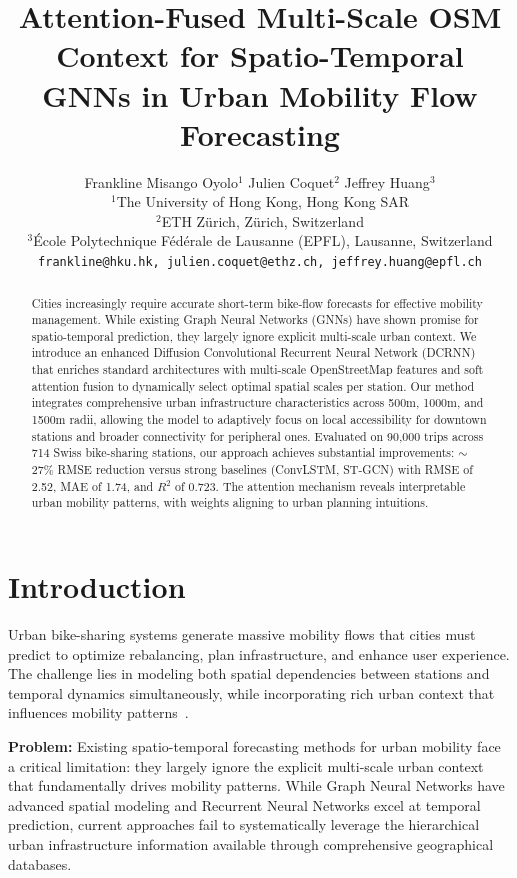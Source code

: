 \documentclass[10pt,twocolumn]{article}
\title{Attention-Fused Multi-Scale OSM Context for Spatio-Temporal GNNs in Urban Mobility Flow Forecasting}
\author{
  Frankline Misango Oyolo$^1$ \quad Julien Coquet$^2$ \quad Jeffrey Huang$^3$ \\
  $^1$The University of Hong Kong, Hong Kong SAR \\
  $^2$ETH Zürich, Zürich, Switzerland \\
  $^3$École Polytechnique Fédérale de Lausanne (EPFL), Lausanne, Switzerland \\
  \texttt{frankline@hku.hk, julien.coquet@ethz.ch, jeffrey.huang@epfl.ch}
}
\begin{document}
\maketitle

\begin{abstract}
Cities increasingly require accurate short-term bike-flow forecasts for effective mobility management. While existing Graph Neural Networks (GNNs) have shown promise for spatio-temporal prediction, they largely ignore explicit multi-scale urban context. We introduce an enhanced Diffusion Convolutional Recurrent Neural Network (DCRNN) that enriches standard architectures with multi-scale OpenStreetMap features and soft attention fusion to dynamically select optimal spatial scales per station. Our method integrates comprehensive urban infrastructure characteristics across 500m, 1000m, and 1500m radii, allowing the model to adaptively focus on local accessibility for downtown stations and broader connectivity for peripheral ones. Evaluated on 90,000 trips across 714 Swiss bike-sharing stations, our approach achieves substantial improvements: $\sim$27\% RMSE reduction versus strong baselines (ConvLSTM, ST-GCN) with RMSE of 2.52, MAE of 1.74, and $R^2$ of 0.723. The attention mechanism reveals interpretable urban mobility patterns, with weights aligning to urban planning intuitions.
\end{abstract}

\section{Introduction}

Urban bike-sharing systems generate massive mobility flows that cities must predict to optimize rebalancing, plan infrastructure, and enhance user experience. The challenge lies in modeling both spatial dependencies between stations and temporal dynamics simultaneously, while incorporating rich urban context that influences mobility patterns~\cite{li2018}.

\textbf{Problem:} Existing spatio-temporal forecasting methods for urban mobility face a critical limitation: they largely ignore the explicit multi-scale urban context that fundamentally drives mobility patterns. While Graph Neural Networks have advanced spatial modeling and Recurrent Neural Networks excel at temporal prediction, current approaches fail to systematically leverage the hierarchical urban infrastructure information available through comprehensive geographical databases.
\end{document}
